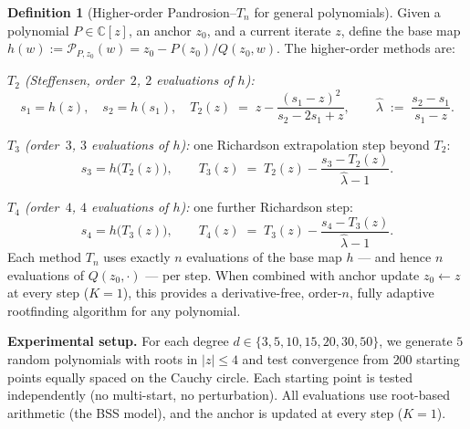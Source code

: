 \documentclass[11pt,a4paper]{article}
\theoremstyle{definition}
\newtheorem{definition}{Definition}[section]
\newcommand{\CC}{\mathbb{C}}
\begin{document}
\begin{definition}[Higher-order Pandrosion--$T_n$ for general polynomials]
\label{def:higher_order_universal}
Given a polynomial $P \in \CC[z]$, an anchor $z_0$, and a current iterate $z$, define the base map $h(w) := \mathcal{P}_{P,z_0}(w) = z_0 - P(z_0)/Q(z_0, w)$.  The higher-order methods are:

\medskip

\emph{$T_2$ (Steffensen, order~$2$, $2$ evaluations of $h$):}
\begin{equation}
  \label{eq:T2_universal}
  s_1 = h(z), \quad s_2 = h(s_1), \quad
  T_2(z) \;=\; z - \frac{(s_1 - z)^2}{s_2 - 2s_1 + z},
  \qquad
  \hat{\lambda} \;:=\; \frac{s_2 - s_1}{s_1 - z}.
\end{equation}

\emph{$T_3$ (order~$3$, $3$ evaluations of $h$):}  one Richardson extrapolation step beyond $T_2$:
\begin{equation}
  \label{eq:T3_universal}
  s_3 = h\bigl(T_2(z)\bigr), \qquad
  T_3(z) \;=\; T_2(z) - \frac{s_3 - T_2(z)}{\hat{\lambda} - 1}.
\end{equation}

\emph{$T_4$ (order~$4$, $4$ evaluations of $h$):}  one further Richardson step:
\begin{equation}
  \label{eq:T4_universal}
  s_4 = h\bigl(T_3(z)\bigr), \qquad
  T_4(z) \;=\; T_3(z) - \frac{s_4 - T_3(z)}{\hat{\lambda} - 1}.
\end{equation}
Each method $T_n$ uses exactly $n$ evaluations of the base map $h$ --- and hence $n$ evaluations of $Q(z_0, \cdot)$ --- per step.  When combined with anchor update $z_0 \leftarrow z$ at every step ($K = 1$), this provides a derivative-free, order-$n$, fully adaptive rootfinding algorithm for any polynomial.
\end{definition}

\medskip

\textbf{Experimental setup.}  For each degree $d \in \{3, 5, 10, 15, 20, 30, 50\}$, we generate $5$ random polynomials with roots in $|z| \leq 4$ and test convergence from $200$ starting points equally spaced on the Cauchy circle.  Each starting point is tested independently (no multi-start, no perturbation).  All evaluations use root-based arithmetic (the BSS model), and the anchor is updated at every step ($K = 1$).
\end{document}
